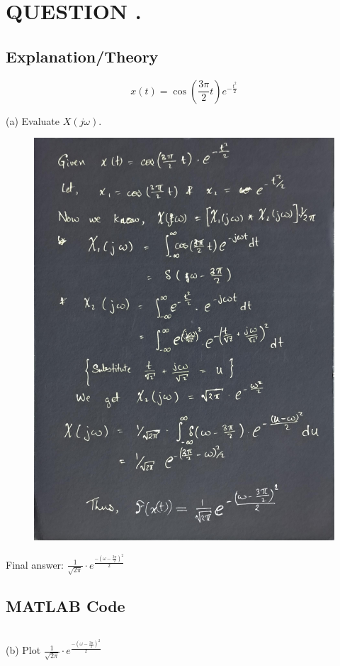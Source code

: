 \section*{QUESTION \quesNo.}

\subsection*{Explanation/Theory}

\[
    x(t) = \cos\left(\frac{3\pi}{2} t\right) e^{-\frac{t^2}{2}}
\]

(a) Evaluate \(X(j\omega)\).

\begin{figure}[H]
    \centering
    \includegraphics[width = .55\textwidth]{./imgs/2_solution.jpg}
\end{figure}

Final answer: $\frac{1}{\sqrt{2\pi}} \cdot e^{\frac{- \left(\omega - \frac{3\pi}{2}\right)^2}{2}}$


\pagebreak
\subsection*{MATLAB Code}

\[\] \vspace{-40px}

(b) Plot $\frac{1}{\sqrt{2\pi}} \cdot e^{\frac{- \left(\omega - \frac{3\pi}{2}\right)^2}{2}}$



\[\] \vspace{-40px}

